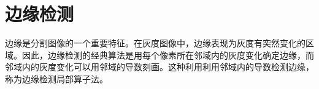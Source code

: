 \section{边缘检测}\label{sec:edge}

边缘是分割图像的一个重要特征。在灰度图像中，边缘表现为灰度有突然变化的区域。因此，边缘检测的经典算法是用每个像素所在邻域内的灰度变化确定边缘，而邻域内的灰度变化可以用邻域的导数刻画。这种利用利用邻域内的导数检测边缘，称为边缘检测局部算子法。





